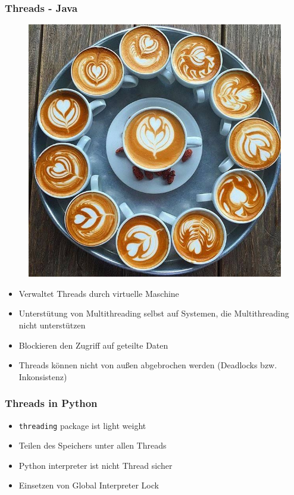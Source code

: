 \documentclass[12pt,utf8, handout]{beamer}
\begin{document}
\begin{frame}
\frametitle{Threads - Java}
\begin{figure}
\includegraphics[scale=0.15]{img/serveimage.jpeg}
\end{figure}
\begin{itemize}
	\item Verwaltet Threads durch virtuelle Maschine
	\item Unterstütung von Multithreading selbst auf Systemen, die Multithreading nicht unterstützen
	\item Blockieren den Zugriff auf geteilte Daten
	\item Threads können nicht von außen abgebrochen werden (Deadlocks bzw. Inkonsistenz)
\end{itemize}
\end{frame}

\begin{frame}
\frametitle{Threads in Python}
\begin{itemize}
	\item \texttt{threading} package ist light weight
	\item Teilen des Speichers unter allen Threads
	\item Python interpreter ist nicht Thread sicher
	\item Einsetzen von Global Interpreter Lock
\end{itemize}
\end{frame}
\end{document}
